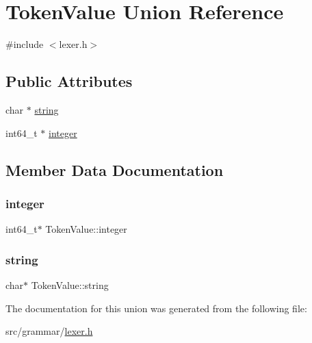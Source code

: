 \hypertarget{unionTokenValue}{}\section{Token\+Value Union Reference}
\label{unionTokenValue}


{\ttfamily \#include $<$lexer.\+h$>$}

\subsection*{Public Attributes}
\begin{DoxyCompactItemize}
\item 
char $\ast$ \hyperlink{unionTokenValue_a3b1e2055668d6218a03382edf28ef1d1}{string}
\item 
int64\+\_\+t $\ast$ \hyperlink{unionTokenValue_a1f7400828ff3e25ed607e8e7907a09f6}{integer}
\end{DoxyCompactItemize}


\subsection{Member Data Documentation}
\hypertarget{unionTokenValue_a1f7400828ff3e25ed607e8e7907a09f6}{}\label{unionTokenValue_a1f7400828ff3e25ed607e8e7907a09f6} 
\subsubsection{\texorpdfstring{integer}{integer}}
{\footnotesize\ttfamily int64\+\_\+t$\ast$ Token\+Value\+::integer}

\hypertarget{unionTokenValue_a3b1e2055668d6218a03382edf28ef1d1}{}\label{unionTokenValue_a3b1e2055668d6218a03382edf28ef1d1} 
\subsubsection{\texorpdfstring{string}{string}}
{\footnotesize\ttfamily char$\ast$ Token\+Value\+::string}



The documentation for this union was generated from the following file\+:\begin{DoxyCompactItemize}
\item 
src/grammar/\hyperlink{lexer_8h}{lexer.\+h}\end{DoxyCompactItemize}
